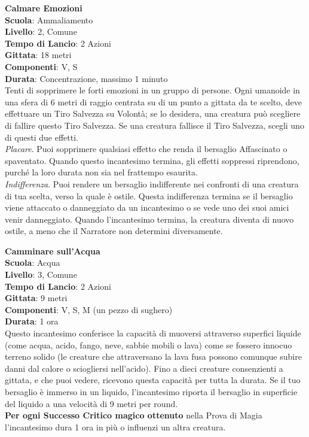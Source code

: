 \begin{multicols}{2}
\medskip\textbf{Calmare Emozioni}\\
\textbf{Scuola}: Ammaliamento\\
\textbf{Livello}: 2, Comune\\
\textbf{Tempo di Lancio}: 2 Azioni\\
\textbf{Gittata}: 18 metri\\
\textbf{Componenti}: V, S\\
\textbf{Durata}: Concentrazione, massimo 1 minuto\\
Tenti di sopprimere le forti emozioni in un gruppo di persone. Ogni umanoide in una sfera di 6 metri di raggio centrata su di un punto a gittata da te scelto, deve effettuare un Tiro Salvezza su Volontà; se lo desidera, una creatura può scegliere di fallire questo Tiro Salvezza. Se una creatura fallisce il Tiro Salvezza, scegli uno di questi due effetti. \\
\textit{Placare}. Puoi sopprimere qualsiasi effetto che renda il bersaglio Affascinato o spaventato. Quando questo incantesimo termina, gli effetti soppressi riprendono, purché la loro durata non sia nel frattempo esaurita.\\
\textit{Indifferenza}. Puoi rendere un bersaglio indifferente nei confronti di una creatura di tua scelta, verso la quale è ostile. Questa indifferenza termina se il bersaglio viene attaccato o danneggiato da un incantesimo o se vede uno dei suoi amici venir danneggiato. Quando l'incantesimo termina, la creatura diventa di nuovo ostile, a meno che il Narratore non determini diversamente.

\medskip\textbf{Camminare sull'Acqua}\\
\textbf{Scuola}: Acqua\\
\textbf{Livello}: 3, Comune\\
\textbf{Tempo di Lancio}: 2 Azioni\\
\textbf{Gittata}: 9 metri\\
\textbf{Componenti}: V, S, M (un pezzo di sughero)\\
\textbf{Durata}: 1 ora\\
Questo incantesimo conferisce la capacità di muoversi attraverso superfici liquide (come acqua, acido, fango, neve, sabbie mobili o lava) come se fossero innocuo terreno solido (le creature che attraversano la lava fusa possono comunque subire danni dal calore o sciogliersi nell'acido). Fino a dieci creature consenzienti a gittata, e che puoi vedere, ricevono questa capacità per tutta la durata. Se il tuo bersaglio è immerso in un liquido, l'incantesimo riporta il bersaglio in superficie del liquido a una velocità di 9 metri per round.\\
\textbf{Per ogni Successo Critico magico ottenuto} nella Prova di Magia l'incantesimo dura 1 ora in più o influenzi un altra creatura.


\end{multicols}
